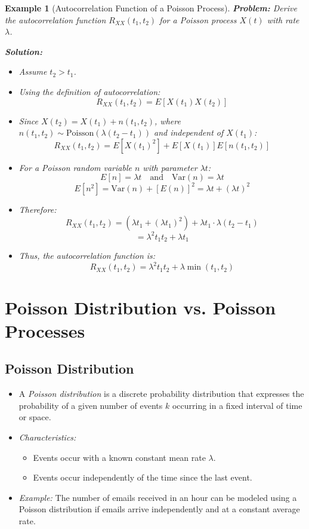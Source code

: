 \documentclass[12pt]{article}
\newtheorem{example}{Example}
\begin{document}
\begin{example}[Autocorrelation Function of a Poisson Process]
    \textbf{Problem:} Derive the autocorrelation function \( R_{XX}(t_1, t_2) \) for a Poisson process \( X(t) \) with rate \( \lambda \).
    
    \textbf{Solution:}
    \begin{itemize}
        \item Assume \( t_2 > t_1 \).
        \item Using the definition of autocorrelation:
        \[
        R_{XX}(t_1, t_2) = E[X(t_1) X(t_2)]
        \]
        \item Since \( X(t_2) = X(t_1) + n(t_1, t_2) \), where \( n(t_1, t_2) \sim \text{Poisson}(\lambda (t_2 - t_1)) \) and independent of \( X(t_1) \):
        \[
        R_{XX}(t_1, t_2) = E[X(t_1)^2] + E[X(t_1)] E[n(t_1, t_2)]
        \]
        \item For a Poisson random variable \( n \) with parameter \( \lambda t \):
        \[
        E[n] = \lambda t \quad \text{and} \quad \text{Var}(n) = \lambda t
        \]
        \[
        E[n^2] = \text{Var}(n) + [E(n)]^2 = \lambda t + (\lambda t)^2
        \]
        \item Therefore:
        \[
        R_{XX}(t_1, t_2) = (\lambda t_1 + (\lambda t_1)^2) + \lambda t_1 \cdot \lambda (t_2 - t_1)
        \]
        \[
        = \lambda^2 t_1 t_2 + \lambda t_1
        \]
        \item Thus, the autocorrelation function is:
        \[
        R_{XX}(t_1, t_2) = \lambda^2 t_1 t_2 + \lambda \min(t_1, t_2)
        \]
    \end{itemize}
\end{example}

\section{Poisson Distribution vs. Poisson Processes}

\subsection{Poisson Distribution}
\begin{itemize}
    \item A \textit{Poisson distribution} is a discrete probability distribution that expresses the probability of a given number of events \( k \) occurring in a fixed interval of time or space.
    \item \textit{Characteristics:}
    \begin{itemize}
        \item Events occur with a known constant mean rate \( \lambda \).
        \item Events occur independently of the time since the last event.
    \end{itemize}
    \item \textit{Example:} The number of emails received in an hour can be modeled using a Poisson distribution if emails arrive independently and at a constant average rate.
\end{itemize}
\end{document}

